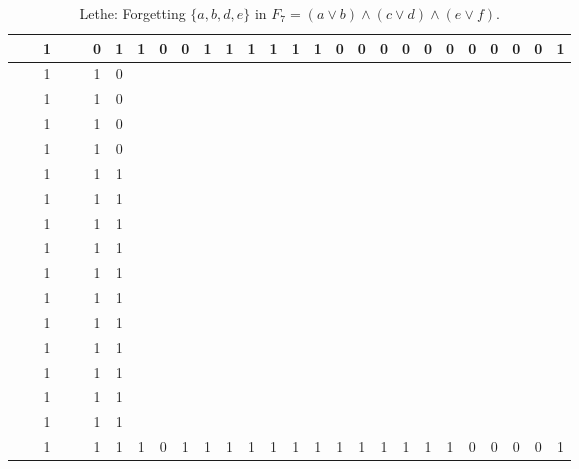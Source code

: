 \begin{table}[!tb]
\begin{tabular}{|c|c|c|c|c|c|c|c|c|c|c|c|c|c|c|c|c|c|c|c|c|c|c|c|c|c|c|}
        \rowcolor{red!40}  &  & 1 &  &  & 0 & 1 & 1 & 0 & 0 & 1 & 1 & 1 & 1 & 1 & 1 & 0 & 0 & 0 & 0 & 0 & 0 & 0 & 0 & 0 & 0 & 1 \\ \hline
        \rowcolor{green!40}  &  & 1 &  &  & 1 & 0 &  &  &  &  &  &  &  &  &  &  &  &  &  &  &  &  &  &  &  &  \\ \hline
        \rowcolor{green!40}  &  & 1 &  &  & 1 & 0 &  &  &  &  &  &  &  &  &  &  &  &  &  &  &  &  &  &  &  &  \\ \hline
        \rowcolor{green!40}  &  & 1 &  &  & 1 & 0 &  &  &  &  &  &  &  &  &  &  &  &  &  &  &  &  &  &  &  &  \\ \hline
        \rowcolor{green!40}  &  & 1 &  &  & 1 & 0 &  &  &  &  &  &  &  &  &  &  &  &  &  &  &  &  &  &  &  &  \\ \hline
        \rowcolor{green!40}  &  & 1 &  &  & 1 & 1 &  &  &  &  &  &  &  &  &  &  &  &  &  &  &  &  &  &  &  &  \\ \hline
        \rowcolor{green!40}  &  & 1 &  &  & 1 & 1 &  &  &  &  &  &  &  &  &  &  &  &  &  &  &  &  &  &  &  &  \\ \hline
        \rowcolor{green!40}  &  & 1 &  &  & 1 & 1 &  &  &  &  &  &  &  &  &  &  &  &  &  &  &  &  &  &  &  &  \\ \hline
        \rowcolor{green!40}  &  & 1 &  &  & 1 & 1 &  &  &  &  &  &  &  &  &  &  &  &  &  &  &  &  &  &  &  &  \\ \hline
        \rowcolor{green!40}  &  & 1 &  &  & 1 & 1 &  &  &  &  &  &  &  &  &  &  &  &  &  &  &  &  &  &  &  &  \\ \hline
        \rowcolor{green!40}  &  & 1 &  &  & 1 & 1 &  &  &  &  &  &  &  &  &  &  &  &  &  &  &  &  &  &  &  &  \\ \hline
        \rowcolor{green!40}  &  & 1 &  &  & 1 & 1 &  &  &  &  &  &  &  &  &  &  &  &  &  &  &  &  &  &  &  &  \\ \hline
        \rowcolor{green!40}  &  & 1 &  &  & 1 & 1 &  &  &  &  &  &  &  &  &  &  &  &  &  &  &  &  &  &  &  &  \\ \hline
        \rowcolor{green!40}  &  & 1 &  &  & 1 & 1 &  &  &  &  &  &  &  &  &  &  &  &  &  &  &  &  &  &  &  &  \\ \hline
        \rowcolor{green!40}  &  & 1 &  &  & 1 & 1 &  &  &  &  &  &  &  &  &  &  &  &  &  &  &  &  &  &  &  &  \\ \hline
        \rowcolor{green!40}  &  & 1 &  &  & 1 & 1 &  &  &  &  &  &  &  &  &  &  &  &  &  &  &  &  &  &  &  &  \\ \hline
        \rowcolor{green!40}  &  & 1 &  &  & 1 & 1 & 1 & 0 & 1 & 1 & 1 & 1 & 1 & 1 & 1 & 1 & 1 & 1 & 1 & 1 & 1 & 0 & 0 & 0 & 0 & 1 \\ \hline
    \end{tabular}
    \caption{Lethe: Forgetting $\{a, b, d, e\}$ in $F_{7} = (a \lor b) \land (c \lor d) \land (e \lor f)$.}
    \label{tab:lethe-F7-abde}
\end{table}
